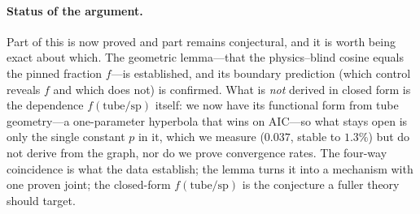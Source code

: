 \paragraph{Status of the argument.} Part of this is now proved and part
remains conjectural, and it is worth being exact about which. The geometric
lemma---that the physics--blind cosine equals the pinned fraction $f$---is
established, and its boundary prediction (which control reveals $f$ and which
does not) is confirmed. What is \emph{not} derived in closed form is the
dependence $f(\text{tube/sp})$ itself: we now have its functional form from
tube geometry---a one-parameter hyperbola that wins on AIC---so what stays open
is only the single constant $p$ in it, which we measure ($0.037$, stable to
$1.3\%$) but do not derive from the graph, nor do we prove convergence rates. The four-way coincidence is what the data establish; the lemma
turns it into a mechanism with one proven joint; the closed-form
$f(\text{tube/sp})$ is the conjecture a fuller theory should target.
